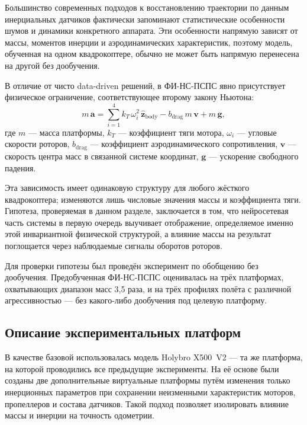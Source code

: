 Большинство современных подходов к восстановлению траектории по данным инерциальных датчиков фактически запоминают статистические особенности шумов и динамики конкретного аппарата. Эти особенности напрямую зависят от массы, моментов инерции и аэродинамических характеристик, поэтому модель, обученная на одном квадрокоптере, обычно не может быть напрямую перенесена на другой без дообучения. 

В отличие от чисто data-driven решений, в ФИ-НС-ПСПС явно присутствует физическое ограничение, соответствующее второму закону Ньютона:
\begin{equation}
	m\,\mathbf{a} =
	\sum_{i=1}^{4} k_T\,\omega_i^2\,\hat{\mathbf{z}}_{\mathrm{body}}
	- b_{\mathrm{drag}}\,m\,\mathbf{v}
	+ m\,\mathbf{g},
	\label{eq:newton_full}
\end{equation}
где $m$ — масса платформы, $k_T$ — коэффициент тяги мотора, $\omega_i$ — угловые скорости роторов, $b_{\mathrm{drag}}$ — коэффициент аэродинамического сопротивления, $\mathbf{v}$ — скорость центра масс в связанной системе координат, $\mathbf{g}$ — ускорение свободного падения. 

Эта зависимость имеет одинаковую структуру для любого жёсткого квадрокоптера; изменяются лишь числовые значения массы и коэффициента тяги. Гипотеза, проверяемая в данном разделе, заключается в том, что нейросетевая часть системы в первую очередь выучивает отображение, определяемое именно этой инвариантной физической структурой, а влияние массы на результат поглощается через наблюдаемые сигналы оборотов роторов.

Для проверки гипотезы был проведён эксперимент по обобщению без дообучения. Предобученная ФИ-НС-ПСПС оценивалась на трёх платформах, охватывающих диапазон масс 3,5 раза, и на трёх профилях полёта с различной агрессивностью — без какого-либо дообучения под целевую платформу. 

\subsection{Описание экспериментальных платформ}

В качестве базовой использовалась модель Holybro X500~V2 — та же платформа, на которой проводились все предыдущие эксперименты. На её основе были созданы две дополнительные виртуальные платформы путём изменения только инерционных параметров при сохранении неизменными характеристик моторов, пропеллеров и состава датчиков. Такой подход позволяет изолировать влияние массы и инерции на точность одометрии.

